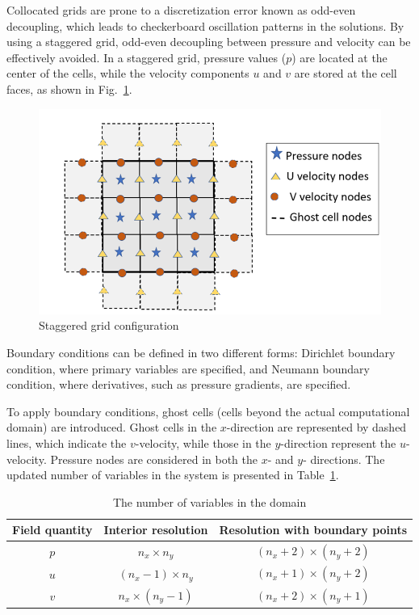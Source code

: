 \documentclass{article}
\numberwithin{equation}{section}
\numberwithin{figure}{section}
\begin{document}
Collocated grids are prone to a discretization error known as odd-even 
decoupling, which leads to checkerboard oscillation patterns in the solutions. By 
using a staggered grid, odd-even decoupling between pressure and velocity can be 
effectively avoided. In a staggered grid, pressure values (\( p \)) are located at the 
center of the cells, while the velocity components \( u \) and \( v \) are stored at the cell 
faces, as shown in Fig.~\ref{fig:staggered}.
\begin{figure}
    \centering
    \includegraphics[scale=0.8]{staggered_grid.png}
    \caption{Staggered grid configuration}
    \label{fig:staggered}
\end{figure}

Boundary conditions can be defined in two different forms: 
Dirichlet boundary condition, where primary variables are specified, and 
Neumann boundary condition, where derivatives, such as pressure gradients, are specified. 

To apply boundary conditions, ghost cells (cells beyond the actual computational domain) 
are introduced. Ghost cells in the \( x \)-direction are represented by dashed lines, 
which indicate the \( v \)-velocity, while those in the \( y \)-direction represent 
the \( u \)-velocity. Pressure nodes are considered in both the \( x \)- and \( y \)-
directions. The updated number of variables in the system is presented in Table~\ref{tab:variables}.

\begin{table}
    \centering
    \caption{The number of variables in the domain}
    \label{tab:variables}
    \begin{tabular}{c c c}
        \toprule
        Field quantity & Interior resolution   & Resolution with boundary points \\
        \midrule
        $p$             & $n_x \times n_y$      & $(n_x +2)\times(n_y +2)$         \\
        $u$             & $(n_x -1) \times n_y$ & $(n_x+1)\times(n_y +2) $        \\
        $v$             & $n_x \times (n_y -1)$ & $(n_x +2)\times(n_y +1)$         \\
        \bottomrule        
    \end{tabular}
\end{table}
\end{document}
